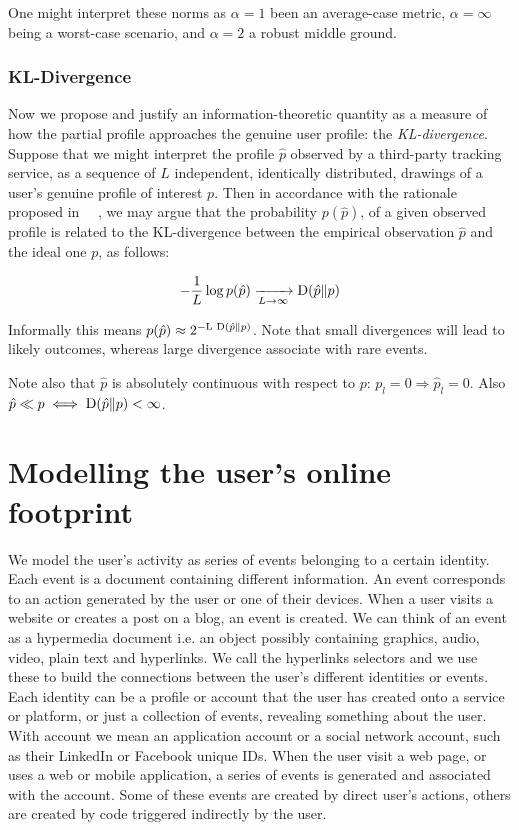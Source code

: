 One might interpret these norms as $\alpha = 1$ been an average-case metric, $\alpha=\infty$ being a worst-case scenario, and $\alpha=2$ a robust middle ground.

\subsubsection{KL-Divergence}

Now we propose and justify an information-theoretic quantity as a measure of how the partial profile approaches the genuine user profile: the \emph{KL-divergence}. Suppose that we might interpret the profile $\hat{p}$ observed by a third-party tracking service, as a sequence of $L$ independent, identically distributed, drawings of a user's genuine profile of interest $p$. Then in accordance with the rationale proposed in ~\cite{parra2014measuring}~\cite{Rebollo11SecTech}, we may argue that the probability $p(\hat{p})$, of a given observed profile is related to the KL-divergence between the empirical observation $\hat{p}$ and the ideal one $p$, as follows:

$$ - \frac {1}{L} \log{p(\hat{p})} \xrightarrow[L \to \infty]{} \textnormal{D}(\hat{p} \| p) $$

Informally this means $p(\hat{p}) \approx 2^{-\textnormal{L D}(\hat{p} \| p) } $. Note that small divergences will lead to likely outcomes, whereas large divergence associate with rare events.

Note also that $\hat{p}$ is absolutely continuous with respect to $p$: $p_l = 0 \Rightarrow \hat{p}_l = 0$. Also $\hat{p} \ll p \iff  \textnormal{D}(\hat{p} \| p) < \infty$.

\section{Modelling the user's online footprint}
\noindent
We model the user's activity as series of events belonging to a certain identity. Each event is a document containing different information. An event corresponds to an action generated by the user or one of their devices. When a user visits a website or creates a post on a blog, an event is created. We can think of an event as a hypermedia document i.e. an object possibly containing graphics, audio, video, plain text and hyperlinks. We call the hyperlinks selectors and we use these to build the connections between the user's different identities or events. Each identity can be a profile or account that the user has created onto a service or platform, or just a collection of events, revealing something about the user. With account we mean an application account or a social network account, such as their LinkedIn or Facebook unique IDs. When the user visit a web page, or uses a web or mobile application, a series of events is generated and associated with the account. Some of these events are created by direct user's actions, others are created by code triggered indirectly by the user.

